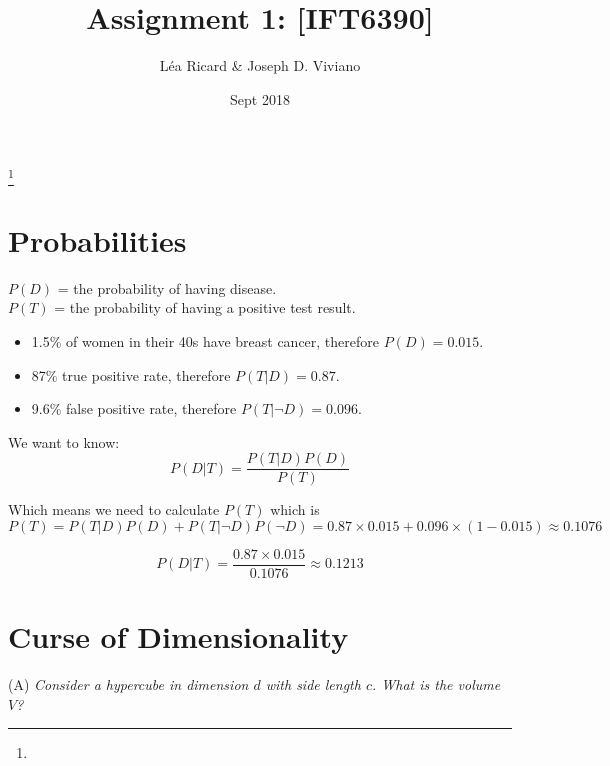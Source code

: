 \documentclass{amsart}
\theoremstyle{definition}
\theoremstyle{remark}
\numberwithin{equation}{section}
\begin{document}
\title{Assignment 1: [IFT6390]}

\author{L\'ea Ricard \& Joseph D. Viviano}
\address{Universit\'e de Montr\'eal}
\curraddr{}
\thanks{}
\date{Sept 2018}

\maketitle

\section{Probabilities}

$P(D)$ = the probability of having disease. \\
$P(T)$ = the probability of having a positive test result. \\

\begin{itemize}
    \item 1.5\% of women in their 40s have breast cancer, therefore $P(D) = 0.015$.
    \item 87\% true positive rate, therefore $P(T|D) = 0.87$.
    \item 9.6\% false positive rate, therefore $P(T|\neg D) = 0.096$.
\end{itemize}

We want to know: \\

\begin{equation}
P(D|T) = \frac{P(T|D) P(D)}{P(T)}
\end{equation}

Which means we need to calculate $P(T)$ which is \\

\begin{equation}
   P(T) = P(T|D)P(D) + P(T |\neg D)P(\neg D) 
        = 0.87 \times 0.015 + 0.096 \times (1-0.015) 
        \approx 0.1076 
\end{equation}

\begin{equation}
    P(D|T) = \frac{0.87 \times 0.015}{0.1076} \approx 0.1213
\end{equation}

\section{Curse of Dimensionality}

(A) \textit{Consider a hypercube in dimension $d$ with side length $c$. 
            What is the volume $V$?} \\
\end{document}
